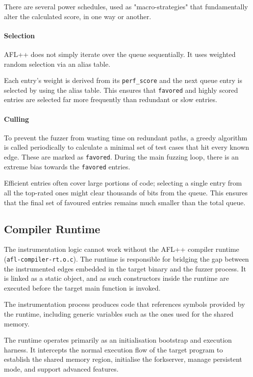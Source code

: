 There are several power schedules, used as "macro-strategies" that fundamentally alter the calculated score, in one way or another.

\paragraph{Selection} AFL++ does not simply iterate over the queue sequentially. It uses weighted random selection via an alias table.

Each entry's weight is derived from its \texttt{perf\_score} and the next queue entry is selected by using the alias table. This ensures that \texttt{favored} and highly scored entries are selected far more frequently than redundant or slow entries.

\paragraph{Culling} To prevent the fuzzer from wasting time on redundant paths, a greedy algorithm is called periodically to calculate a minimal set of test cases that hit every known edge. These are marked as \texttt{favored}. During the main fuzzing loop, there is an extreme bias towards the \texttt{favored} entries.

Efficient entries often cover large portions of code; selecting a single entry from all the top-rated ones might clear thousands of bits from the queue. This ensures that the final set of favoured entries remains much smaller than the total queue.

\subsection{Compiler Runtime}

The instrumentation logic cannot work without the AFL++ compiler runtime (\texttt{afl-compiler-rt.o.c}). The runtime is responsible for bridging the gap between the instrumented edges embedded in the target binary and the fuzzer process. It is linked as a static object, and as such constructors inside the runtime are executed before the target main function is invoked.

The instrumentation process produces code that references symbols provided by the runtime, including generic variables such as the ones used for the shared memory.

The runtime operates primarily as an initialisation bootstrap and execution harness. It intercepts the normal execution flow of the target program to establish the shared memory region, initialise the forkserver, manage persistent mode, and support advanced features.

